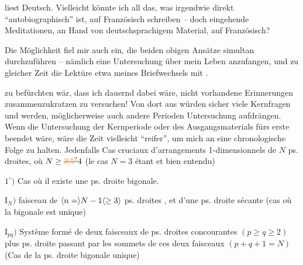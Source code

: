 liest Deutsch. Vielleicht könnte ich all das, was irgendwie direkt ``autobiographisch'' ist, auf Französisch schreiben -- doch eingehende Meditationen,  an Hand von deutschsprachigem Material, auf Französisch?

Die Möglichkeit fiel mir auch ein, die beiden obigen Ansätze simultan durchzuführen -- nämlich eine  Untersuchung über mein Leben  anzufangen, und zu gleicher Zeit die Lektüre etwa meines Briefwechsels mit .

zu befürchten wär, dass ich dauernd dabei wäre, nicht vorhandene Erinnerungen zusammenzukratzen zu versuchen! Von dort aus würden  sicher viele Kernfragen   und    werden, möglicherweise auch andere Perioden   Untersuchung aufdrängen. Wenn die Untersuchung der Kernperiode oder des Ausgangsmaterials fürs erste beendet wäre, wäre die Zeit vielleicht ``reifer'', um mich an eine chronologische Folge zu halten. Jedenfalls
Cas cruciaux d'arrangements 1-dimensionnels de $N$ ps. droites, où $N\geq\deleted{\unsure{3|5}}4$ (le cas $N=3$ étant  et bien entendu)

$1^\circ)$ Cas où il existe une ps. droite bigonale.

$\mathrm{I}_{N})$ faisceau de $\inserted{n=}N-1\inserted{\geq3}$ ps. droites  , et d'une ps. droite sécante (cas où la  bigonale est unique)

$\mathrm{I}_{pq})$ Système formé de deux faisceaux de  ps. droites concourantes $(p\geq q\geq2)$ plus  ps. droite passant par les sommets de ces deux faisceaux $(p+q+1=N)$ (Cas de la ps. droite bigonale unique)

